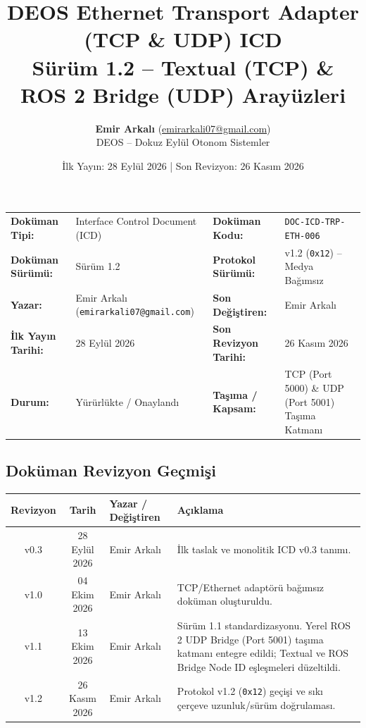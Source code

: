 \documentclass[a4paper,10pt]{article}
\title{\textbf{DEOS Ethernet Transport Adapter (TCP \& UDP) ICD}\\
\large Sürüm 1.2 -- Textual (TCP) \& ROS 2 Bridge (UDP) Arayüzleri}
\author{\textbf{Emir Arkalı} (\href{mailto:emirarkali07@gmail.com}{emirarkali07@gmail.com})\\DEOS -- Dokuz Eylül Otonom Sistemler}
\date{İlk Yayın: 28 Eylül 2026 \quad | \quad Son Revizyon: 26 Kasım 2026}
\newcommand{\hex}[1]{\texttt{0x#1}}
\newcommand{\code}[1]{\texttt{#1}}
\begin{document}
\maketitle

\begin{center}
\small
\begin{tabularx}{\textwidth}{ll lX}
\toprule
\textbf{Doküman Tipi:} & Interface Control Document (ICD) & \textbf{Doküman Kodu:} & \code{DOC-ICD-TRP-ETH-006} \\
\textbf{Doküman Sürümü:} & Sürüm 1.2 & \textbf{Protokol Sürümü:} & v1.2 (\hex{12}) -- Medya Bağımsız \\
\textbf{Yazar:} & Emir Arkalı (\texttt{emirarkali07@gmail.com}) & \textbf{Son Değiştiren:} & Emir Arkalı \\
\textbf{İlk Yayın Tarihi:} & 28 Eylül 2026 & \textbf{Son Revizyon Tarihi:} & 26 Kasım 2026 \\
\textbf{Durum:} & Yürürlükte / Onaylandı & \textbf{Taşıma / Kapsam:} & TCP (Port 5000) \& UDP (Port 5001) Taşıma Katmanı \\
\bottomrule
\end{tabularx}
\end{center}

\subsection*{Doküman Revizyon Geçmişi}
\begin{center}
\small
\begin{tabularx}{\textwidth}{c c l X}
\toprule
\textbf{Revizyon} & \textbf{Tarih} & \textbf{Yazar / Değiştiren} & \textbf{Açıklama} \\
\midrule
v0.3 & 28 Eylül 2026 & Emir Arkalı & İlk taslak ve monolitik ICD v0.3 tanımı. \\
v1.0 & 04 Ekim 2026 & Emir Arkalı & TCP/Ethernet adaptörü bağımsız doküman oluşturuldu. \\
v1.1 & 13 Ekim 2026 & Emir Arkalı & Sürüm 1.1 standardizasyonu. Yerel ROS 2 UDP Bridge (Port 5001) taşıma katmanı entegre edildi; Textual ve ROS Bridge Node ID eşleşmeleri düzeltildi. \\
v1.2 & 26 Kasım 2026 & Emir Arkalı & Protokol v1.2 (\hex{12}) geçişi ve sıkı çerçeve uzunluk/sürüm doğrulaması. \\
\bottomrule
\end{tabularx}
\end{center}
\vspace{0.8em}
\end{document}
